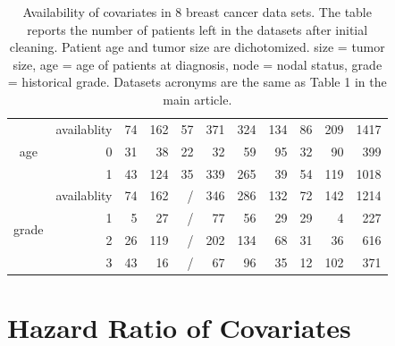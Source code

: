 \documentclass{article}
\begin{document}
\begin{table}[H]
\begin{tabular}{rrrrrrrrrrr}
    \multicolumn{1}{c}{\multirow{3}[0]{*}{age }} & availablity & 74    & 162   & 57    & 371   & 324   & 134   & 86    & 209   & 1417 \\
    \multicolumn{1}{c}{} & 0     & 31    & 38    & 22    & 32    & 59    & 95    & 32    & 90    & 399 \\
    \multicolumn{1}{c}{} & 1     & 43    & 124   & 35    & 339   & 265   & 39    & 54    & 119   & 1018 \\
    \multicolumn{1}{c}{\multirow{4}[0]{*}{grade}} & availablity & 74    & 162   & /     & 346   & 286   & 132   & 72    & 142   & 1214 \\
    \multicolumn{1}{c}{} & 1     & 5     & 27    & /     & 77    & 56    & 29    & 29    & 4     & 227 \\
    \multicolumn{1}{c}{} & 2     & 26    & 119   & /     & 202   & 134   & 68    & 31    & 36    & 616 \\
    \multicolumn{1}{c}{} & 3     & 43    & 16    & /     & 67    & 96    & 35    & 12    & 102   & 371 \\

  \bottomrule
  \end{tabular}
  \caption{Availability of covariates in 8 breast cancer data sets. The table reports the number of  patients left in the datasets after initial cleaning. Patient age and tumor size are dichotomized. size = tumor size, age = age of patients at diagnosis, node = nodal status,  grade = historical grade. Datasets acronyms are the same as Table 1 in the main article.}
  \label{table-cov}
\end{table}


\newpage
\section{Hazard Ratio of Covariates}  
  
\end{document}
